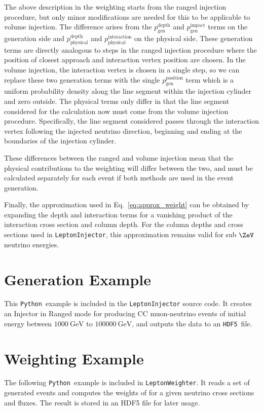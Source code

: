 \documentclass[main.tex]{subfiles}
\newcommand{\LeptonInjector}{\texttt{LeptonInjector}}
\newcommand{\LeptonWeighter}{\texttt{LeptonWeighter}}
\newcommand{\Python}{\texttt{Python }}
\newcommand{\hdf}{\texttt{HDF5}}
\begin{document}
The above description in the weighting starts from the ranged injection procedure, but only minor modifications are needed for this to be applicable to volume injection.
The difference arises from the $p_\textrm{gen}^\textrm{depth}$ and $p_\textrm{gen}^\textrm{impact}$ terms on the generation side and $p_\textrm{physical}^\textrm{depth}$ and $p_\textrm{physical}^\textrm{interaction}$ on the physical side.
These generation terms are directly analogous to steps in the ranged injection procedure where the position of closest approach and interaction vertex position are chosen.
In the volume injection, the interaction vertex is chosen in a single step, so we can replace these two generation terms with the single $p_\textrm{gen}^\textrm{position}$ term which is a uniform probability density along the line segment within the injection cylinder and zero outside.
The physical terms only differ in that the line segment considered for the calculation now must come from the volume injection procedure.
Specifically, the line segment considered passes through the interaction vertex following the injected neutrino direction, beginning and ending at the boundaries of the injection cylinder.

These differences between the ranged and volume injection mean that the physical contributions to the weighting will differ between the two, and must be calculated separately for each event if both methods are used in the event generation.

Finally, the approximation used in Eq.~\ref{eq:approx_weight} can be obtained by expanding the depth and interaction terms for a vanishing product of the interaction cross section and column depth.
For the column depths and cross sections used in \LeptonInjector{}, this approximation remains valid for sub $\si\ZeV$ neutrino energies.

\section{Generation Example\label{sec:example_generation}}

This \Python example is included in the \LeptonInjector{} source code.
It creates an Injector in Ranged mode for producing CC muon-neutrino events of initial energy between $\SI{1000}\GeV$ to $\SI{100000}\GeV$, and outputs the data to an \hdf~file. 

\section{Weighting Example\label{sec:example_weighting}}

The following \Python example is included in \LeptonWeighter{}.
It reads a set of generated events and computes the weights of for a given neutrino cross sections and fluxes.
The result is stored in an HDF5 file for later usage.
\end{document}
